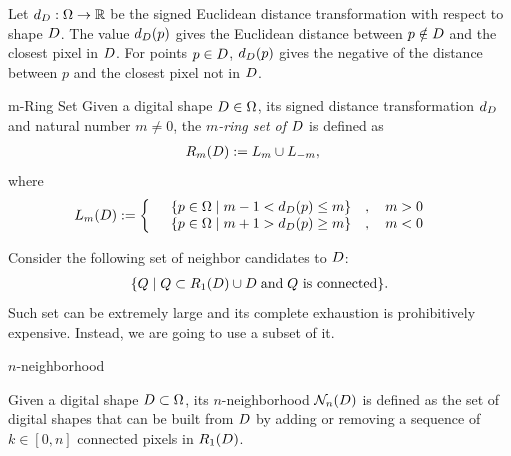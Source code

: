 Let $d_{D}:\Omega \rightarrow \mathbb{R}$ be the signed Euclidean distance transformation with respect to shape $D$. The value $d_{D}(p)$ gives the Euclidean distance between $p \notin D$ and the closest pixel in $D$. For points $p \in D$, $d_{D}(p)$ gives the negative of the distance between $p$ and the closest pixel not in $D$.
\begin{definition}{m-Ring Set}
Given a digital shape $D \in\Omega$, its signed distance transformation $d_{D}$ and natural number $m \neq 0$, the {\em $m$-ring set of $D$} is defined as
\begin{align*}
	R_m(D) &:= L_m \cup L_{-m},
\end{align*}
where
\begin{align*}
	L_m(D) &:= \left\{ \quad \begin{array}{cc}
		\left\{ p \in \Omega \; | \; m-1 < d_{D}(p) \leq m \right\} & , \quad m>0\\
		\left\{ p \in \Omega \; | \; m+1 > d_{D}(p) \geq m \right\} & , \quad m<0
		\end{array} \right.
\end{align*}
\end{definition}
 Consider the following set of neighbor candidates to $D$:
\begin{align*}
\{ Q \; | \; Q \subset R_1(D) \cup D \; \text{and} \; \text{$Q$ is connected} \}.
\end{align*}
Such set can be extremely large and its complete exhaustion is prohibitively expensive.  Instead, we are going to use a subset of it.
\begin{definition}{$n$-neighborhood}

	Given a digital shape $D \subset \Omega$, its $n$-neigh\-bor\-hood $\mathcal{N}_n(D)$ is defined as the set of digital shapes that can be built from $D$ by adding or removing a sequence of $k \in [0,n]$ connected pixels in $R_1(D)$.

\end{definition}

